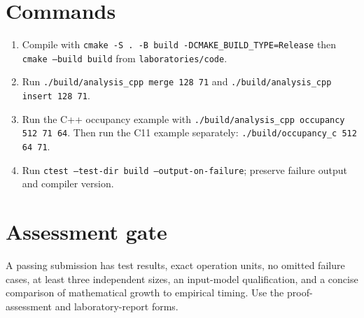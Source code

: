 \documentclass[11pt]{article}
\begin{document}
\section{Commands}
\begin{enumerate}
\item Compile with \texttt{cmake -S . -B build -DCMAKE\_BUILD\_TYPE=Release} then \texttt{cmake --build build} from \texttt{laboratories/code}.
\item Run \texttt{./build/analysis\_cpp merge 128 71} and \texttt{./build/analysis\_cpp insert 128 71}.
\item Run the C++ occupancy example with \texttt{./build/analysis\_cpp occupancy 512 71 64}. Then run the C11 example separately: \texttt{./build/occupancy\_c 512 64 71}.
\item Run \texttt{ctest --test-dir build --output-on-failure}; preserve failure output and compiler version.
\end{enumerate}
\section{Assessment gate}
A passing submission has test results, exact operation units, no omitted failure cases, at least three independent sizes, an input-model qualification, and a concise comparison of mathematical growth to empirical timing. Use the proof-assessment and laboratory-report forms.
\end{document}
